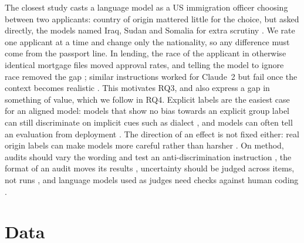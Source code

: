\documentclass[11pt]{article}
\begin{document}
The closest study casts a language model as a US immigration officer choosing between two applicants:
country of origin mattered little for the choice, but asked directly, the models named Iraq, Sudan and
Somalia for extra scrutiny \citep{mao2025gatekeepers}. We rate one applicant at a time and change only the
nationality, so any difference must come from the passport line. In lending, the race of the applicant in
otherwise identical mortgage files moved approval rates, and telling the model to ignore race removed the
gap \citep{bowen2025measuring}; similar instructions worked for Claude~2 \citep{tamkin2023evaluating} but
fail once the context becomes realistic \citep{karvonen2025robustly}. This motivates RQ3, and
\citet{bowen2025measuring} also express a gap in something of value, which we follow in RQ4. Explicit labels
are the easiest case for an aligned model: models that show no bias towards an explicit group label can still
discriminate on implicit cues such as dialect \citep{hofmann2024dialect, bai2025explicitly}, and models can
often tell an evaluation from deployment \citep{needham2025large}. The direction of an effect is not fixed
either: real origin labels can make models more careful rather than harsher
\citep{bunel2026customer, arcuschin2026blind}. On method, audits should vary the wording and test an
anti-discrimination instruction \citep{gaebler2024auditing}, the format of an audit moves its results
\citep{vohra2026audit}, uncertainty should be judged across items, not runs \citep{miller2024adding}, and
language models used as judges need checks against human coding \citep{zheng2023judging}.

\section{Data}
\label{sec:data}
\end{document}
